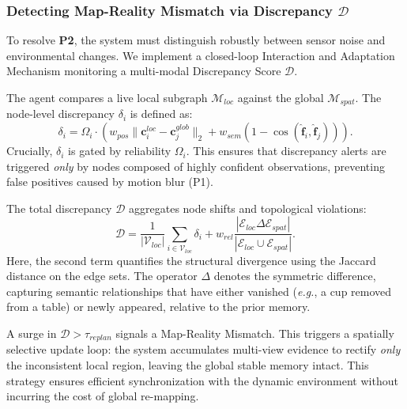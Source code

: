 \documentclass[conference]{IEEEtran}
\begin{document}
\subsubsection{Detecting Map-Reality Mismatch via Discrepancy $\mathcal{D}$}
To resolve \textbf{P2}, the system must distinguish robustly between sensor noise and environmental changes. We implement a closed-loop Interaction and Adaptation Mechanism monitoring a multi-modal Discrepancy Score $\mathcal{D}$.

The agent compares a live local subgraph $\mathcal{M}_{loc}$ against the global $\mathcal{M}_{spat}$. The node-level discrepancy $\delta_i$ is defined as:
\begin{equation}
    \delta_i = \Omega_i \cdot \left( w_{pos} \|\mathbf{c}_i^{loc} - \mathbf{c}_j^{glob}\|_2 + w_{sem} (1 - \cos(\hat{\mathbf{f}}_i, \hat{\mathbf{f}}_j)) \right). \label{eq:delta_calc}
\end{equation}
Crucially, $\delta_i$ is gated by reliability $\Omega_i$. This ensures that discrepancy alerts are triggered \textit{only} by nodes composed of highly confident observations, preventing false positives caused by motion blur (P1).

The total discrepancy $\mathcal{D}$ aggregates node shifts and topological violations:
\begin{equation}
    \mathcal{D} = \frac{1}{|\mathcal{V}_{loc}|} \sum_{i \in \mathcal{V}_{loc}} \delta_i + w_{rel} \frac{|\mathcal{E}_{loc} \Delta \mathcal{E}_{spat}|}{|\mathcal{E}_{loc} \cup \mathcal{E}_{spat}|}. \label{eq:total_discrepancy}
\end{equation}
Here, the second term quantifies the structural divergence using the Jaccard distance on the edge sets. The operator $\Delta$ denotes the symmetric difference, capturing semantic relationships that have either vanished (\emph{e.g.}, a cup removed from a table) or newly appeared, relative to the prior memory.

A surge in $\mathcal{D} > \tau_{replan}$ signals a Map-Reality Mismatch. This triggers a spatially selective update loop: the system accumulates multi-view evidence to rectify \textit{only} the inconsistent local region, leaving the global stable memory intact. This strategy ensures efficient synchronization with the dynamic environment without incurring the cost of global re-mapping.
\end{document}
